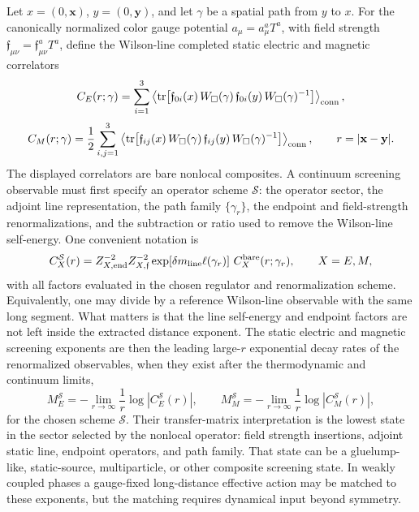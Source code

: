 \begin{definition}
\label{def:qcd-gauge-invariant-static-screening}
Let \(x=(0,\mathbf x)\), \(y=(0,\mathbf y)\), and let \(\gamma\) be a
spatial path from \(y\) to \(x\).  For the canonically normalized color
gauge potential \(a_\mu=a_\mu^aT^a\), with field strength
\(\mathfrak f_{\mu\nu}=\mathfrak f_{\mu\nu}^aT^a\), define the Wilson-line
completed static electric and magnetic correlators
\[
  C_E(r;\gamma)
  =
  \sum_{i=1}^3
  \left\langle
  \operatorname{tr}\!\left[
    \mathfrak f_{0i}(x)\,
    W_{\square}(\gamma)\,
    \mathfrak f_{0i}(y)\,
    W_{\square}(\gamma)^{-1}
  \right]\right\rangle_{\rm conn},
\]
\begin{equation}
  C_M(r;\gamma)
  =
  \frac12\sum_{i,j=1}^3
  \left\langle
  \operatorname{tr}\!\left[
    \mathfrak f_{ij}(x)\,
    W_{\square}(\gamma)\,
    \mathfrak f_{ij}(y)\,
    W_{\square}(\gamma)^{-1}
  \right]\right\rangle_{\rm conn},
  \qquad
  r=|\mathbf x-\mathbf y|.
  \label{eq:qcd-cfl-screening-correlators}
\end{equation}
The displayed correlators are bare nonlocal composites.  A continuum
screening observable must first specify an operator scheme
\(\mathcal S\): the operator sector, the adjoint line representation, the path
family \(\{\gamma_r\}\), the endpoint and field-strength renormalizations,
and the subtraction or ratio used to remove the Wilson-line self-energy.  One
convenient notation is
\begin{equation}
  C_X^{\mathcal S}(r)
  =
  Z_{X,\rm end}^{-2}Z_{X,\mathfrak f}^{-2}
  \exp\!\left[\delta m_{\rm line}\ell(\gamma_r)\right]\,
  C_X^{\rm bare}(r;\gamma_r),
  \qquad X=E,M,
  \label{eq:qcd-cfl-renormalized-screening-correlator}
\end{equation}
with all factors evaluated in the chosen regulator and renormalization
scheme.  Equivalently, one may divide by a reference Wilson-line observable
with the same long segment.  What matters is that the line self-energy and
endpoint factors are not left inside the extracted distance exponent.  The
static electric and magnetic screening exponents are then the leading
large-\(r\) exponential decay rates of the renormalized observables, when they
exist after the thermodynamic and continuum limits,
\begin{equation}
  M_E^{\mathcal S}=-\lim_{r\to\infty}\frac1r\log |C_E^{\mathcal S}(r)|,
  \qquad
  M_M^{\mathcal S}=-\lim_{r\to\infty}\frac1r\log |C_M^{\mathcal S}(r)|,
  \label{eq:qcd-cfl-screening-exponents}
\end{equation}
for the chosen scheme \(\mathcal S\).  Their transfer-matrix interpretation is
the lowest state in the sector selected by the nonlocal operator: field
strength insertions, adjoint static line, endpoint operators, and path family.
That state can be a gluelump-like, static-source, multiparticle, or other
composite screening state.  In weakly coupled phases a gauge-fixed
long-distance effective action may be matched to these exponents, but the
matching requires dynamical input beyond symmetry.
\end{definition}

